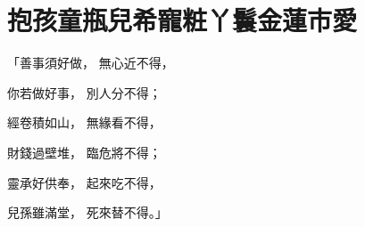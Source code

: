 %

\chapter{抱孩童瓶兒希寵\KG 粧丫鬟金蓮市愛}


\begin{showcontents}{}




「善事須好做，  無心近不得，

你若做好事，  別人分不得；

經卷積如山，  無緣看不得，

財錢過壁堆，  臨危將不得；

靈承好供奉，  起來吃不得，

兒孫雖滿堂，  死來替不得。」


\end{showcontents}

